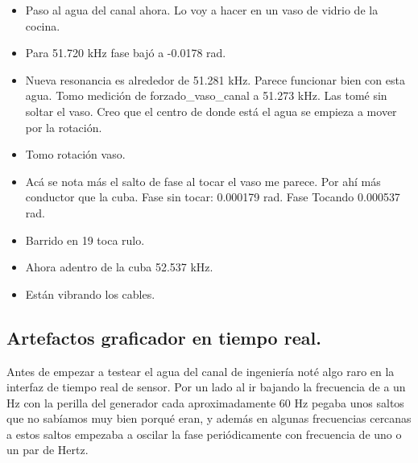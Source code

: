 \begin{itemize}
	\item Paso al agua del canal ahora. Lo voy a hacer en un vaso de vidrio de la cocina. 
	\item Para 51.720 kHz fase bajó a -0.0178 rad. 
	\item  Nueva resonancia es alrededor de 51.281 kHz. Parece funcionar bien con esta agua. Tomo medición de forzado\_vaso\_canal a 51.273 kHz. Las tomé sin soltar el vaso. Creo que el centro de donde está el agua se empieza a mover por la rotación.
	\item Tomo rotación vaso. 
	\item Acá se nota más el salto de fase al tocar el vaso me parece. Por ahí más conductor que la cuba. Fase sin tocar: 0.000179 rad. Fase Tocando 0.000537 rad. 
	\item Barrido en 19 toca rulo. 
	
	\item Ahora adentro de la cuba 52.537 kHz. 
	\item Están vibrando los cables.
\end{itemize}

\subsection*{Artefactos graficador en tiempo real.}
Antes de empezar a testear el agua del canal de ingeniería noté algo raro en la interfaz de tiempo real de sensor. Por un lado al ir bajando la frecuencia de a un Hz con la perilla del generador cada aproximadamente 60 Hz pegaba unos saltos que no sabíamos muy bien porqué eran, y además en algunas frecuencias cercanas a estos saltos empezaba a oscilar la fase periódicamente con frecuencia de uno o un par de Hertz.

